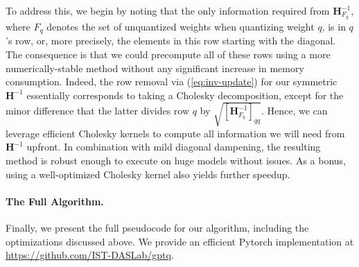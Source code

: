 To address this, we begin by noting that the only information required from $\mathbf{H}_{F_q}^{-1}$, where $F_q$ denotes the set of unquantized weights when quantizing weight $q$, is in $q$'s row, or, more precisely, the elements in this row starting with the diagonal. The consequence is that we could precompute all of these rows using a more numerically-stable method without any significant increase in memory consumption. Indeed, the row removal via (\ref{eq:inv-update}) for our symmetric $\mathbf{H}^{-1}$ essentially corresponds to taking a Cholesky decomposition, except for the minor difference that the latter divides row $q$ by $\sqrt{[\mathbf{H}^{-1}_{F_q}]_{qq}}$. Hence, we can leverage efficient Cholesky kernels to compute all information we will need from $\mathbf{H}^{-1}$ upfront. In combination with mild diagonal dampening, the resulting method is robust enough to execute on huge models without issues. As a bonus, using a well-optimized Cholesky kernel also yields further speedup. 

\paragraph{The Full Algorithm.} Finally, we present the full pseudocode for our algorithm, including the optimizations discussed above. We provide an efficient Pytorch implementation at \url{https://github.com/IST-DASLab/gptq}.

\newlength{\commentindent}

\makeatletter
\renewcommand{\algorithmiccomment}[1]{\unskip\hfill\makebox[\commentindent][l]{\textit{//~#1}}\par}
\LetLtxMacro{\oldalgorithmic}{\algorithmic}
\renewcommand{\algorithmic}[1][0]{
  \oldalgorithmic[#1]
  \renewcommand{\ALC@com}[1]{
    \ifnum\pdfstrcmp{##1}{default}=0\else\unskip\hfill\makebox[\commentindent][l]{\textit{//~##1}}\par\fi}
}
\makeatother

